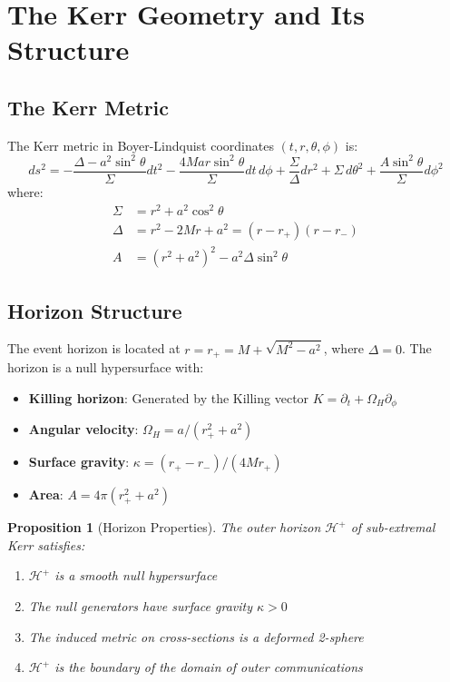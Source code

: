 \documentclass[12pt,a4paper]{article}
\newtheorem{proposition}[theorem]{Proposition}
\begin{document}
\section{The Kerr Geometry and Its Structure}

\subsection{The Kerr Metric}

The Kerr metric in Boyer-Lindquist coordinates $(t, r, \theta, \phi)$ is:
\begin{equation}
ds^2 = -\frac{\Delta - a^2\sin^2\theta}{\Sigma}dt^2 - \frac{4Mar\sin^2\theta}{\Sigma}dt\,d\phi + \frac{\Sigma}{\Delta}dr^2 + \Sigma\, d\theta^2 + \frac{A\sin^2\theta}{\Sigma}d\phi^2
\end{equation}
where:
\begin{align}
\Sigma &= r^2 + a^2\cos^2\theta \\
\Delta &= r^2 - 2Mr + a^2 = (r - r_+)(r - r_-) \\
A &= (r^2 + a^2)^2 - a^2\Delta\sin^2\theta
\end{align}

\subsection{Horizon Structure}

The event horizon is located at $r = r_+ = M + \sqrt{M^2 - a^2}$, where $\Delta = 0$. The horizon is a null hypersurface with:
\begin{itemize}
    \item \textbf{Killing horizon}: Generated by the Killing vector $K = \partial_t + \Omega_H \partial_\phi$
    \item \textbf{Angular velocity}: $\Omega_H = a/(r_+^2 + a^2)$
    \item \textbf{Surface gravity}: $\kappa = (r_+ - r_-)/(4Mr_+)$
    \item \textbf{Area}: $A = 4\pi(r_+^2 + a^2)$
\end{itemize}

\begin{proposition}[Horizon Properties]
The outer horizon $\mathcal{H}^+$ of sub-extremal Kerr satisfies:
\begin{enumerate}[label=(\roman*)]
    \item $\mathcal{H}^+$ is a smooth null hypersurface
    \item The null generators have surface gravity $\kappa > 0$
    \item The induced metric on cross-sections is a deformed 2-sphere
    \item $\mathcal{H}^+$ is the boundary of the domain of outer communications
\end{enumerate}
\end{proposition}
\end{document}
